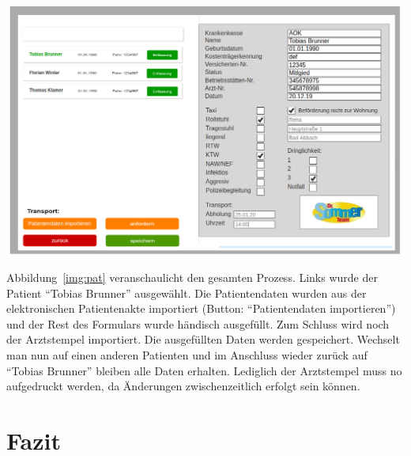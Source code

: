 \documentclass[a4paper, ngerman, 12pt]{scrartcl}
\begin{document}
\begin{center}
\begin{minipage}{\textwidth}
\centering
\includegraphics[width=\textwidth]{Bilder/pat1.png}
\label{img:pat}
\end{minipage}
\end{center}
Abbildung~\ref{img:pat} veranschaulicht den gesamten Prozess. Links wurde der Patient ``Tobias Brunner'' ausgewählt. Die Patientendaten wurden aus der elektronischen Patientenakte importiert (Button: ``Patientendaten importieren'') und der Rest des Formulars wurde händisch ausgefüllt. Zum Schluss wird noch der Arztstempel importiert. Die ausgefüllten Daten werden gespeichert. Wechselt man nun auf einen anderen Patienten und im Anschluss wieder zurück auf ``Tobias Brunner'' bleiben alle Daten erhalten. Lediglich der Arztstempel muss no aufgedruckt werden, da Änderungen zwischenzeitlich erfolgt sein können.
\section{Fazit}
\end{document}

